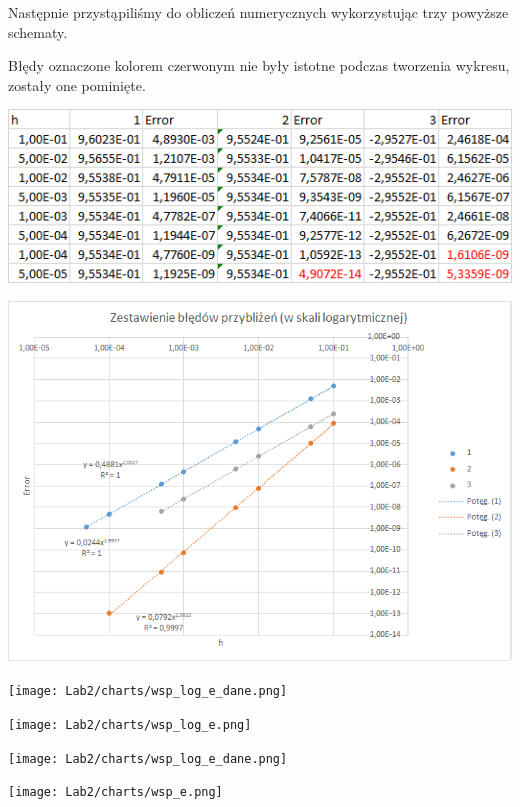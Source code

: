 Następnie przystąpiliśmy do obliczeń numerycznych wykorzystując trzy powyższe schematy.

\newpage

Błędy oznaczone kolorem czerwonym nie były istotne podczas tworzenia wykresu, zostały one pominięte.

\includegraphics{Lab2/charts/wsp_log_dane.png}

\includegraphics{Lab2/charts/wsp_log.png}
\newpage

\texttt{[image: Lab2/charts/wsp\_log\_e\_dane.png]}

\texttt{[image: Lab2/charts/wsp\_log\_e.png]}
\newpage

\texttt{[image: Lab2/charts/wsp\_log\_e\_dane.png]}

\texttt{[image: Lab2/charts/wsp\_e.png]}
\newpage











